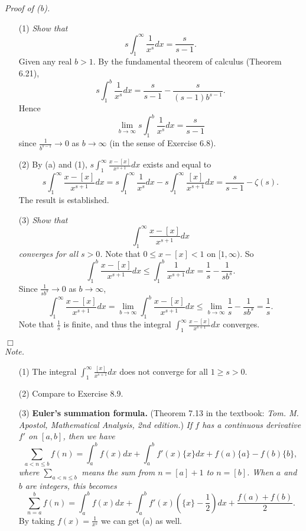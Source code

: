 \documentclass{article}
\begin{document}
\emph{Proof of (b).}
\begin{enumerate}
  \item[(1)]
  \emph{Show that}
  \[
    s \int_{1}^{\infty} \frac{1}{x^{s}} dx = \frac{s}{s-1}.
  \]
  Given any real $b > 1$. By the fundamental theorem of calculus (Theorem 6.21),
  \[
    s \int_{1}^{b} \frac{1}{x^{s}} dx
    = \frac{s}{s-1} - \frac{s}{(s-1)b^{s-1}}.
  \]
  Hence
  \[
    \lim_{b \to \infty} s \int_{1}^{b} \frac{1}{x^{s}} dx = \frac{s}{s-1}
  \]
  since $\frac{1}{b^{s-1}} \to 0$ as $b \to \infty$ (in the sense of Exercise 6.8).

  \item[(2)]
  By (a) and (1),
  $s \int_{1}^{\infty} \frac{x - [x]}{x^{s+1}} dx$ exists
  and equal to
  \[
    s \int_{1}^{\infty} \frac{x - [x]}{x^{s+1}} dx
    = s \int_{1}^{\infty} \frac{1}{x^{s}} dx - s \int_{1}^{\infty} \frac{[x]}{x^{s+1}} dx
    = \frac{s}{s-1} - \zeta(s).
  \]
  The result is established.

  \item[(3)]
  \emph{Show that
  \[
    \int_{1}^{\infty} \frac{x - [x]}{x^{s+1}} dx
  \]
  converges for all $s > 0$.}
  Note that $0 \leq x - [x] < 1$ on $[1,\infty)$.
  So
  \[
    \int_{1}^{b} \frac{x - [x]}{x^{s+1}} dx
    \leq
    \int_{1}^{b} \frac{1}{x^{s+1}} dx
    = \frac{1}{s} - \frac{1}{sb^s}.
  \]
  Since $\frac{1}{sb^{s}} \to 0$ as $b \to \infty$,
  \[
    \int_{1}^{\infty} \frac{x - [x]}{x^{s+1}} dx
    = \lim_{b \to \infty} \int_{1}^{b} \frac{x - [x]}{x^{s+1}} dx
    \leq \lim_{b \to \infty} \frac{1}{s} - \frac{1}{sb^s}
    = \frac{1}{s}.
  \]
  Note that $\frac{1}{s}$ is finite, and thus
  the integral $\int_{1}^{\infty} \frac{x - [x]}{x^{s+1}} dx$
  converges.
\end{enumerate}
$\Box$ \\



\emph{Note.}
\begin{enumerate}
\item[(1)]
The integral
$\int_{1}^{\infty} \frac{[x]}{x^{s+1}} dx$ does not converge for all $1 \geq s > 0$.

\item[(2)]
Compare to Exercise 8.9.

\item[(3)]
\textbf{Euler's summation formula.}
(Theorem 7.13 in the textbook:
\emph{Tom. M. Apostol, Mathematical Analysis, 2nd edition.})
\emph{If $f$ has a continuous derivative $f'$ on $[a,b]$, then we have
\[
  \sum_{a < n \leq b} f(n)
  = \int_{a}^{b} f(x)dx
  + \int_{a}^{b} f'(x)\{x\}dx + f(a)\{a\} - f(b)\{b\},
\]
where $\sum_{a < n \leq b}$ means the sum from $n=[a]+1$ to $n=[b]$.
When $a$ and $b$ are integers, this becomes}
\[
  \sum_{n=a}^{b} f(n)
  = \int_{a}^{b} f(x)dx
  + \int_{a}^{b} f'(x)\left( \{x\}-\frac{1}{2} \right)dx
  + \frac{f(a)+f(b)}{2}.
\]
By taking $f(x) = \frac{1}{x^s}$ we can get (a) as well. \\\\
\end{enumerate}
\end{document}
